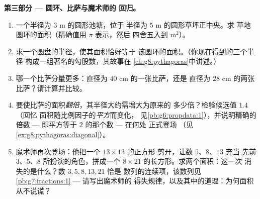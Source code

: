 \begin{problem}[{周末问题 --- 一个著名的“证明”声称
$64 = 65$，借面积与斜率揭穿，
并以比萨与圆环作甜点}]
\medskip
\noindent\textbf{第三部分 --- 圆环、比萨与魔术师的
回归。}
\begin{enumerate}[resume]
  \item 一个半径为 $3$ m 的圆形池塘，位于
        半径为 $5$ m 的圆形草坪正中央。求
        草地圆环的面积（精确值用 $\pi$ 表示，然后
        四舍五入到 m$^2$）。
  \item 求一个圆盘的半径，使其面积恰好等于
        该圆环的面积。（你现在得到的三个半径
        构成一组著名的勾股数，其故事在
        \cref{ch:g8:pythagoras}中讲述。）
  \item 哪一个比萨分量更多：直径为 $40$ cm 的一张比萨，还是
        直径为 $28$ cm 的两张比萨？请计算并比较。
  \item 要使比萨的面积\emph{翻倍}，其半径大约需增大为原来的
        多少倍？检验候选值 $1.4$（回忆
        面积随比例因子的\emph{平方}而变化，
        见\cref{pb:g6:propdata:1}），并说明精确的倍数 ---
        即平方等于 $2$ 的那个数 --- 在何处
        正式登场
        （见\cref{ex:g8:pythagoras:diagonal}）。
  \item 魔术师再次登场：他把一个 $13 \times 13$ 的正方形
        剪开，让数 $5$、$8$、$13$ 充当
        先前 $3$、$5$、$8$ 所扮演的角色，拼成一个
        $8 \times 21$ 的长方形。求两个面积：这一次
        消失的是什么？数 $3, 5, 8, 13, 21$ 恰是
        数列的连续项，该数列见
        \cref{pb:g7:fractions:1} --- 请写出魔术师的
        得失规律，以及其中的道理：为何面积
        从不说谎？
\end{enumerate}
\end{problem}
